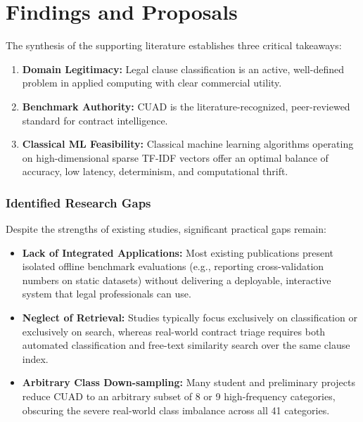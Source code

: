 \section{Findings and Proposals}
\label{sec:findings_and_proposals}
The synthesis of the supporting literature establishes three critical takeaways:
\begin{enumerate}
    \item \textbf{Domain Legitimacy:} Legal clause classification is an active, well-defined problem in applied computing with clear commercial utility.
    \item \textbf{Benchmark Authority:} CUAD is the literature-recognized, peer-reviewed standard for contract intelligence.
    \item \textbf{Classical ML Feasibility:} Classical machine learning algorithms operating on high-dimensional sparse TF-IDF vectors offer an optimal balance of accuracy, low latency, determinism, and computational thrift.
\end{enumerate}

\subsubsection*{Identified Research Gaps}
Despite the strengths of existing studies, significant practical gaps remain:
\begin{itemize}
    \item \textbf{Lack of Integrated Applications:} Most existing publications present isolated offline benchmark evaluations (e.g., reporting cross-validation numbers on static datasets) without delivering a deployable, interactive system that legal professionals can use.
    \item \textbf{Neglect of Retrieval:} Studies typically focus exclusively on classification or exclusively on search, whereas real-world contract triage requires both automated classification and free-text similarity search over the same clause index.
    \item \textbf{Arbitrary Class Down-sampling:} Many student and preliminary projects reduce CUAD to an arbitrary subset of 8 or 9 high-frequency categories, obscuring the severe real-world class imbalance across all 41 categories.
\end{itemize}

